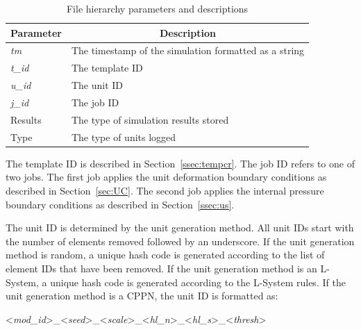 \begin{table}[ht]
\centering
\caption[File hierarchy parameters]{File hierarchy parameters and descriptions}
\label{tab:fhpar}
\begin{tabular}{@{}ll@{}}
\toprule
\multicolumn{1}{c}{\textbf{Parameter}} & \multicolumn{1}{c}{\textbf{Description}}              \\ \midrule
\textit{tm}                            & The timestamp of the simulation formatted as a string \\
\textit{t\_id}                         & The template ID                                       \\
\textit{u\_id}                         & The unit ID                                           \\
\textit{j\_id}                         & The job ID                                            \\
Results                                & The type of simulation results stored                 \\
Type                                   & The type of units logged                              \\ \bottomrule
\end{tabular}
\end{table}

The template ID is described in Section~\ref{ssec:tempcr}. The job ID refers to one of two jobs. The first job applies the unit deformation boundary conditions as described in Section~\ref{sec:UC}. The second job applies the internal pressure boundary conditions as described in Section~\ref{ssec:us}.

The unit ID is determined by the unit generation method. All unit IDs start with the number of elements removed followed by an underscore. If the unit generation method is random, a unique hash code is generated according to the list of element IDs that have been removed. If the unit generation method is an L-System, a unique hash code is generated according to the L-System rules. If the unit generation method is a CPPN, the unit ID is formatted as:

\vspace{\baselineskip}

\centerline{<\textit{mod\_id}>\_<\textit{seed}>\_<\textit{scale}>\_<\textit{hl\_n}>\_<\textit{hl\_s}>\_<\textit{thresh}>}

\vspace{\baselineskip}

